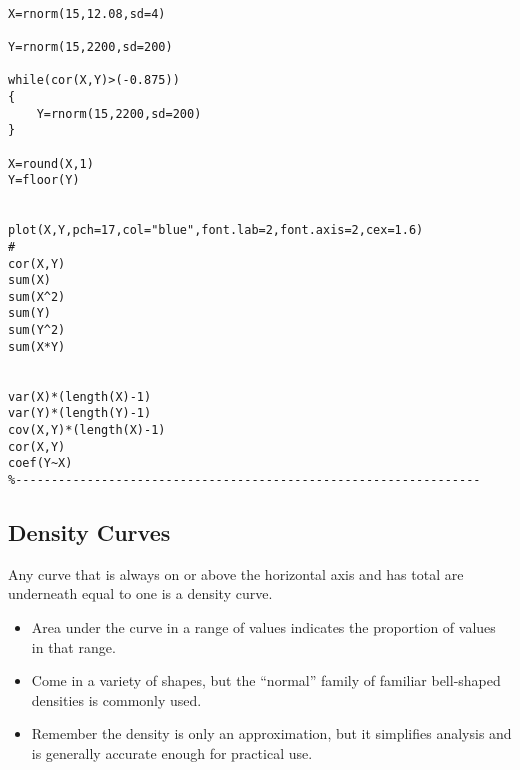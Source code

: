 \documentclass[]{report}
\begin{document}
\begin{verbatim}

X=rnorm(15,12.08,sd=4)

Y=rnorm(15,2200,sd=200)

while(cor(X,Y)>(-0.875))
{
	Y=rnorm(15,2200,sd=200)
}

X=round(X,1)
Y=floor(Y)


plot(X,Y,pch=17,col="blue",font.lab=2,font.axis=2,cex=1.6)
#
cor(X,Y)
sum(X)
sum(X^2)
sum(Y)
sum(Y^2)
sum(X*Y)


var(X)*(length(X)-1)
var(Y)*(length(Y)-1)
cov(X,Y)*(length(X)-1)
cor(X,Y)
coef(Y~X)
%-----------------------------------------------------------------
\end{verbatim}


\subsection{Density Curves}

Any curve that is always on or above the horizontal axis and has
total are underneath equal to one is a density curve.
\begin{itemize}
	\item Area under the curve in a range of values indicates the proportion of values in that range.
	\item Come in a variety of shapes, but the “normal” family of familiar
	bell-shaped densities is commonly used.
	\item Remember the density is only an approximation, but it simpliﬁes analysis and is generally accurate enough for practical
	use.
\end{itemize}
\end{document}
